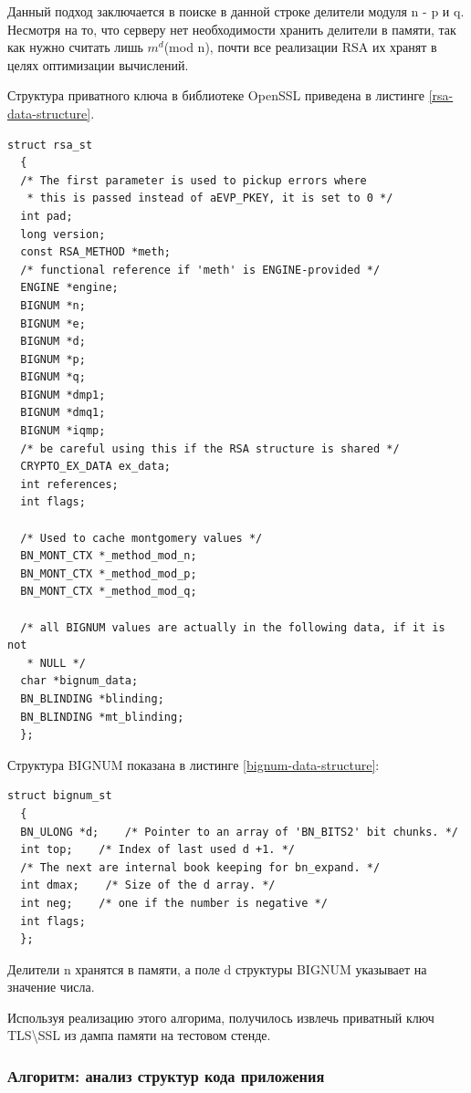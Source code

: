 \documentclass[20pt]{article}
\begin{document}
Данный подход заключается в поиске в данной строке делители модуля n - p и q.
Несмотря на то, что серверу нет необходимости хранить делители в памяти, так
как нужно считать лишь $m^d$(mod n), почти все реализации RSA их хранят в
целях оптимизации вычислений.

Структура приватного ключа в библиотеке OpenSSL приведена в листинге \ref{rsa-data-structure}.

\begin{lstlisting}[caption={Структура приватного ключа RSA},label={rsa-data-structure},breaklines]
struct rsa_st
  {
  /* The first parameter is used to pickup errors where
   * this is passed instead of aEVP_PKEY, it is set to 0 */
  int pad;
  long version;
  const RSA_METHOD *meth;
  /* functional reference if 'meth' is ENGINE-provided */
  ENGINE *engine;
  BIGNUM *n;
  BIGNUM *e;
  BIGNUM *d;
  BIGNUM *p;
  BIGNUM *q;
  BIGNUM *dmp1;
  BIGNUM *dmq1;
  BIGNUM *iqmp;
  /* be careful using this if the RSA structure is shared */
  CRYPTO_EX_DATA ex_data;
  int references;
  int flags;

  /* Used to cache montgomery values */
  BN_MONT_CTX *_method_mod_n;
  BN_MONT_CTX *_method_mod_p;
  BN_MONT_CTX *_method_mod_q;

  /* all BIGNUM values are actually in the following data, if it is not
   * NULL */
  char *bignum_data;
  BN_BLINDING *blinding;
  BN_BLINDING *mt_blinding;
  };
\end{lstlisting}

Структура BIGNUM показана в листинге \ref{bignum-data-structure}:
\begin{lstlisting}[caption={Структура BIGNUM},label={bignum-data-structure},breaklines]
  struct bignum_st
  {
  BN_ULONG *d;    /* Pointer to an array of 'BN_BITS2' bit chunks. */
  int top;    /* Index of last used d +1. */
  /* The next are internal book keeping for bn_expand. */
  int dmax;    /* Size of the d array. */
  int neg;    /* one if the number is negative */
  int flags;
  };
\end{lstlisting}

Делители n хранятся в памяти, а поле d структуры BIGNUM указывает на
значение числа.

Используя реализацию этого алгорима, получилось извлечь
приватный ключ TLS\textbackslash SSL из дампа памяти на тестовом стенде.

\subsubsection{Алгоритм: анализ структур кода приложения}
\end{document}
